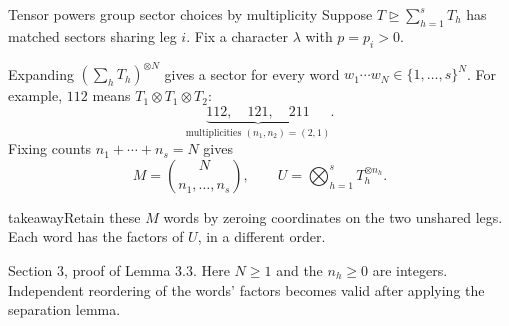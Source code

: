 \documentclass[aspectratio=169,11pt]{beamer}
\newcommand{\degen}{\unrhd}
\newcommand{\source}[1]{\vfill\par{\fontsize{7.5}{9}\selectfont\color{muted}#1\par}}
\newcommand{\takeaway}[1]{\begin{beamercolorbox}[sep=0.65em,wd=\linewidth]{takeaway}#1\end{beamercolorbox}}
\begin{document}
\begin{frame}{Tensor powers group sector choices by multiplicity}
  Suppose $T\degen\sum_{h=1}^{s}T_h$ has matched sectors sharing leg $i$.
  Fix a character $\lambda$ with $p=p_i>0$.
  \par\medskip
  Expanding $(\sum_h T_h)^{\otimes N}$ gives a sector for every word
  $w_1\cdots w_N\in\{1,\ldots,s\}^N$.
  For example, $112$ means $T_1\otimes T_1\otimes T_2$:
  \[
    \underbrace{112,\quad121,\quad211}_{\text{multiplicities }(n_1,n_2)=(2,1)}.
  \]
  Fixing counts $n_1+\cdots+n_s=N$ gives
  \[
    M=\binom{N}{n_1,\ldots,n_s},\qquad
    U=\bigotimes_{h=1}^{s}T_h^{\otimes n_h}.
  \]
  \takeaway{Retain these $M$ words by zeroing coordinates on the two
    unshared legs. Each word has the factors of $U$, in a different order.}
  \source{Section 3, proof of Lemma 3.3. Here $N\ge1$ and the $n_h\ge0$ are
  integers. Independent reordering of the words' factors becomes valid after
  applying the separation lemma.}
\end{frame}
\end{document}
